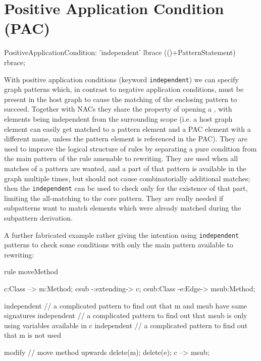 

\section{Positive Application Condition (PAC)}
 \label{pac}

\begin{rail}  
  PositiveApplicationCondition: 
    'independent' lbrace (()+PatternStatement) rbrace;
\end{rail}

With positive application conditions (keyword \texttt{independent}) we can specify graph patterns which, in contrast to negative application conditions, must be present in the host graph to cause the matching of the enclosing pattern to succeed.
Together with NACs they share the property of opening a , with elements being independent from the surrounding scope (i.e. a host graph element can easily get matched to a pattern element and a PAC element with a different name, unless the pattern element is referenced in the PAC). 
They are used to improve the logical structure of rules by separating a pure condition from the main pattern of the rule amenable to rewriting.
They are used when all matches of a pattern are wanted, and a part of that pattern is available in the graph multiple times, but should not cause combinatorially additional matches; then the \texttt{independent} can be used to check only for the existence of that part, limiting the all-matching to the core pattern.
They are really needed if subpatterns want to match elements which were already matched during the subpattern derivation.

\begin{example}
  A further fabricated example rather giving the intention using \texttt{independent} patterns to check some conditions with only the main pattern available to rewriting:

  \begin{grgen}
rule moveMethod
{
  c:Class --> m:Method;
  csub -:extending-> c;
  csub:Class -e:Edge-> msub:Method;
  
  independent {
    // a complicated pattern to find out that m and msub have same signatures
  }
  independent {
    // a complicated pattern to find out that msub is only using variables available in c
  }
  independent {
    // a complicated pattern to find out that m is not used
  }
 
  modify { // move method upwards
    delete(m);
    delete(e);
    c --> msub;
  }
}
  \end{grgen}
\end{example}

